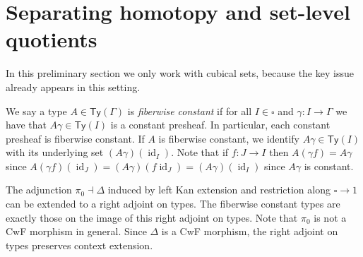\documentclass[10pt,a4paper]{article}
\newcommand\Ty{\mathsf{Ty}}
\DeclareMathOperator\id{id}
\begin{document}
\section{Separating homotopy and set-level quotients}\label{sec:cset-homotopy-quotient-vs-meta-quotient}

In this preliminary section we only work with cubical sets, because the key issue already appears in this setting.

We say a type \(A \in \Ty(\Gamma)\) is \emph{fiberwise constant} if for all \(I \in \square\) and \(\gamma \colon I \to \Gamma\) we have that \(A\gamma \in \Ty(I)\) is a constant presheaf.
In particular, each constant presheaf is fiberwise constant.
If \(A\) is fiberwise constant, we identify \(A\gamma \in \Ty(I)\) with its underlying set \((A\gamma)(\id_I)\).
Note that if \(f \colon J \to I\) then \(A(\gamma f) = A\gamma\) since \(A(\gamma f)(\id_J) = (A\gamma)(f\id_J) = (A\gamma)(\id_I)\) since \(A\gamma\) is constant.

The adjunction \(\pi_0 \dashv \Delta\) induced by left Kan extension and restriction along \(\square \to 1\) can be extended to a right adjoint on types.
The fiberwise constant types are exactly those on the image of this right adjoint on types.
Note that \(\pi_0\) is not a CwF morphism in general.
Since \(\Delta\) is a CwF morphism, the right adjoint on types preserves context extension.
\end{document}
